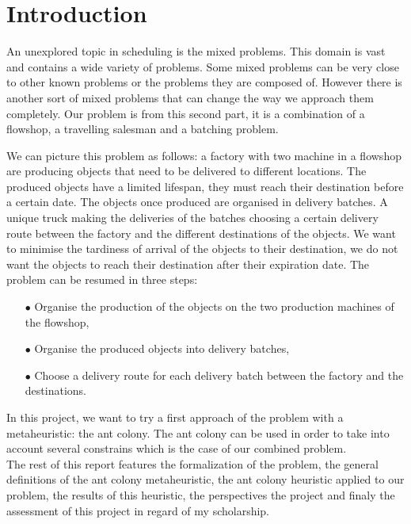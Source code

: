 \documentclass[UTF8, twoside]{EPURapport}
\begin{document}
\chapter{Introduction}

	\hspace{4ex}An unexplored topic in scheduling is the mixed problems. This domain is vast and contains a wide variety of problems. Some mixed problems can be very close to other known problems or the problems they are composed of. However there is another sort of mixed problems that can change the way we approach them completely. Our problem is from this second part, it is a combination of a flowshop, a travelling salesman and a batching problem.
	
	We can picture this problem as follows: a factory with two machine in a flowshop are producing objects that need to be delivered to different locations. The produced objects have a limited lifespan, they must reach their destination before a certain date. The objects once produced are organised in delivery batches. A unique truck making the deliveries of the batches choosing a certain delivery route between the factory and the different destinations of the objects. We want to minimise the tardiness of arrival of the objects to their destination, we do not want the objects to reach their destination after their expiration date. The problem can be resumed in three steps:
\begin{itemize}
\item[$\bullet$] Organise the production of the objects on the two production machines of the flowshop,
\item[$\bullet$] Organise the produced objects into delivery batches,
\item[$\bullet$] Choose a delivery route for each delivery batch between the factory and the destinations.
\end{itemize}

	In this project, we want to try a first approach of the problem with a metaheuristic: the ant colony. The ant colony can be used in order to take into account several constrains which is the case of our combined problem.
	\\
	
	The rest of this report features the formalization of the problem, the general definitions of the ant colony metaheuristic, the ant colony heuristic applied to our problem, the results of this heuristic, the perspectives the project and finaly the assessment of this project in regard of my scholarship.
\end{document}
